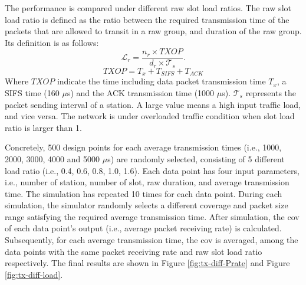 The performance is compared under different \gls{raw} slot load ratios. The \gls{raw} slot load ratio is defined as the ratio between the required transmission time of the 
packets that are allowed to transit in a \gls{raw} group, and duration of the \gls{raw} group. Its definition is as follows:
 \\
\begin{equation}
\mathcal{L}_{r} = \frac {n_r \times TXOP} {d_r \times \mathcal{T}_s}. 
\end{equation}
\begin{equation}
TXOP = T_x + T_{SIFS} +  T_{ACK}
\end{equation}
Where $TXOP$ indicate the time including data packet transmission time $T_x$, a SIFS time (160 $\mu$s) and the ACK transmission time (1000 $\mu$s). $\mathcal{T}_s$ represents the packet sending interval of a station. A large value means a high input traffic load, and vice versa. The network is under overloaded traffic condition when slot load ratio is larger than 1.


Concretely, 500 design points for each average transmission times (i.e., 1000, 2000, 3000, 4000 and 5000 $\mu$s) are randomly selected, 
consisting of 5 different load ratio (i.e., 0.4, 0.6, 0.8, 1.0, 1.6). Each data point has four input parameters, i.e., number of station, number of slot, \gls{raw} duration, and average transmission time. The simulation has repeated 10 times for each data point. During each simulation, the simulator randomly selects a different coverage and packet size range satisfying the required average transmission time. After simulation, the \gls{cov} of each data point's output (i.e., average packet receiving rate) is calculated. Subsequently, for each average transmission time, the \gls{cov} is averaged, among the data points with the same packet receiving rate and \gls{raw} slot load ratio respectively. The final results are shown in Figure \ref{fig:tx-diff-Prate} and Figure \ref{fig:tx-diff-load}. 



